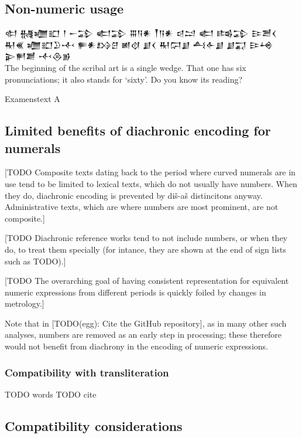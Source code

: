 \documentclass[10pt, a4paper, twoside]{article}
\begin{document}
\subsection{Non-numeric usage}
\epigraph{
{\nafont 𒊕 𒉆𒁾𒊬 𒁹 𒀸𒁉 𒅗𒁉 𒐋𒀀𒀭 𒐕𒀀𒀭 𒁀𒁺 𒅗 𒌤𒁉 𒄿𒍪𒌋}\\
{\nafont 𒊑𒌍 𒁾𒊬𒊒𒋾 𒊓𒀭𒋳𒆪 𒅖𒋼 𒋗𒌋 𒊑𒁶𒋗 𒋀𒅆𒋗 𒋗𒍑 𒄿𒆲 𒉌𒂍𒋢 𒋾𒁲𒂊}\\
{The beginning of the scribal art is a single wedge. That one has six pronunciations; it also stands for `sixty'. Do you know its reading?}}{Examenstext A}

\subsection{Limited benefits of diachronic encoding for numerals}
\label{limitedBenefitsOfDiachrony}

[TODO Composite texts dating back to the period where curved numerals are in use
tend to be limited to lexical texts, which do not usually have numbers.
When they do, diachronic encoding is prevented
by diš-aš distincitons anyway.
Administrative texts, which are where numbers are most prominent,
are not composite.]

[TODO Diachronic reference works tend to not include numbers, or when they do,
to treat them specially (for intance, they are shown at the
end of sign lists such as TODO).]

[TODO The overarching goal of having consistent representation for
equivalent numeric expressions from different periods
is quickly foiled by changes in metrology.]

Note that in \cite{Romach24} [TODO(egg): Cite the GitHub repository],
as in many other such analyses, numbers are removed as an early step
in processing; these therefore would not benefit from diachrony in
the encoding of numeric expressions.

\subsubsection{Compatibility with transliteration}
\label{transliteration}
TODO words \cite[295]{Robson2008}
TODO cite \cite[39]{Molina2014}

\subsection{Compatibility considerations}
\label{compatibility}
\end{document}
